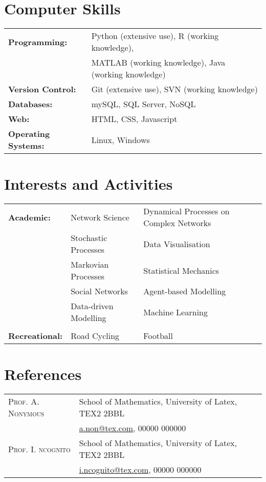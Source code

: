 \documentclass[a4paper,10pt]{article}
\begin{document}

\section{Computer Skills}
\begin{tabular}{R{3.1cm}l}
%
\textbf{Programming:}		& Python (extensive use), R (working knowledge), \\ 
							& MATLAB (working knowledge), Java (working knowledge) \\
\textbf{Version Control:}	& Git (extensive use), SVN (working knowledge) \\
\textbf{Databases:}			& mySQL, SQL Server, NoSQL \\
\textbf{Web:}				& HTML, CSS, Javascript \\
\textbf{Operating Systems:}	& Linux, Windows \\
%
\end{tabular}


\section{Interests and Activities}


\begin{tabular}{R{3.1cm}ll}
%
\textbf{Academic:} 		& Network Science 		& Dynamical Processes on Complex Networks \\
						& Stochastic Processes 	& Data Visualisation \\
						& Markovian Processes 	& Statistical Mechanics \\
						& Social Networks 		& Agent-based Modelling \\
						& Data-driven Modelling & Machine Learning \\
%
& & \\
%
\textbf{Recreational:}	& Road Cycling 			& Football 
%
\end{tabular}


\section{References}

\begin{tabular}{R{3.1cm}l}
\textsc{Prof. A. Nonymous} 	& School of Mathematics, University of Latex, TEX2 2BBL \\ 
							& \href{mailto:a.non@tex.com}{a.non@tex.com}, 00000 000000 \\
\textsc{Prof. I. ncognito} 	& School of Mathematics, University of Latex, TEX2 2BBL \\ 
							& \href{mailto:i.ncognito@tex.com}{i.ncognito@tex.com}, 00000 000000 \\
\end{tabular}

\end{document}
